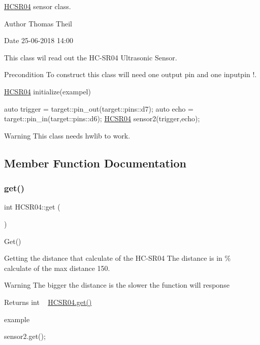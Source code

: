 \mbox{\hyperlink{class_h_c_s_r04}{H\+C\+S\+R04}} sensor class. 

\begin{DoxyAuthor}{Author}
Thomas Theil 
\end{DoxyAuthor}
\begin{DoxyDate}{Date}
25-\/06-\/2018 14\+:00
\end{DoxyDate}
This class wil read out the H\+C-\/\+S\+R04 Ultrasonic Sensor.~\newline
 \begin{DoxyPrecond}{Precondition}
To construct this class will need one output pin and one inputpin !. 
\end{DoxyPrecond}
\mbox{\hyperlink{class_h_c_s_r04}{H\+C\+S\+R04}} initialize(exampel) 
\begin{DoxyCode}
\textcolor{keyword}{auto} trigger = target::pin\_out(target::pins::d7);
\textcolor{keyword}{auto} echo    = target::pin\_in(target::pins::d6);
\mbox{\hyperlink{class_h_c_s_r04}{HCSR04}} sensor2(trigger,echo);
\end{DoxyCode}


\begin{DoxyWarning}{Warning}
This class needs hwlib to work. 
\end{DoxyWarning}


\subsection{Member Function Documentation}
\mbox{\label{class_h_c_s_r04_aced49671ccc6cf679e045d2fb9709d8c}} 
\subsubsection{\texorpdfstring{get()}{get()}}
{\footnotesize\ttfamily int H\+C\+S\+R04\+::get (\begin{DoxyParamCaption}{ }\end{DoxyParamCaption})\hspace{0.3cm}{\ttfamily [virtual]}}



Get() 

Getting the distance that calculate of the H\+C-\/\+S\+R04 The distance is in \% calculate of the max distance 150.

\begin{DoxyWarning}{Warning}
The bigger the distance is the slower the function will response
\end{DoxyWarning}
\begin{DoxyReturn}{Returns}
int ~\newline
 \mbox{\hyperlink{class_h_c_s_r04_aced49671ccc6cf679e045d2fb9709d8c}{H\+C\+S\+R04.\+get()}}
\end{DoxyReturn}
\begin{DoxyParagraph}{example}

\begin{DoxyCode}
sensor2.get();
\end{DoxyCode}
 
\end{DoxyParagraph}



